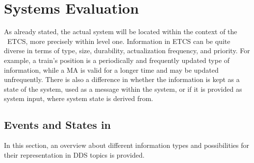 \chapter{Systems Evaluation}
\label{chptr:evaluation}

As already stated, the actual system will be located within the context of the ~\gls*{ETCS}, more precisely within  level one.
Information in \gls*{ETCS} can be quite diverse in terms of type, size, durability, actualization frequency, and priority.
For example, a train's position is a periodically and frequently updated type of information, while a \gls*{MA} is valid for a longer time and may be updated unfrequently.
There is also a difference in whether the information is kept as a state of the system, used as a message within the system, or if it is provided as system input, where system state is derived from.

\section{Events and States in }
In this section, an overview about different information types and possibilities for their representation in \gls*{DDS} topics is provided.

